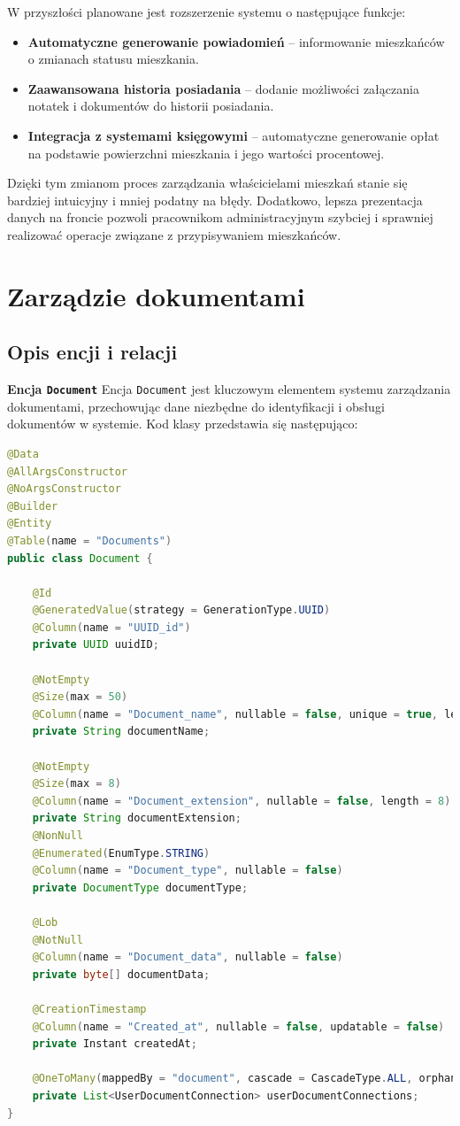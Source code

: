W przyszłości planowane jest rozszerzenie systemu o następujące funkcje:
\begin{itemize}
    \item \textbf{Automatyczne generowanie powiadomień} -- informowanie mieszkańców o zmianach statusu mieszkania.
    \item \textbf{Zaawansowana historia posiadania} -- dodanie możliwości załączania notatek i dokumentów do historii posiadania.
    \item \textbf{Integracja z systemami księgowymi} -- automatyczne generowanie opłat na podstawie powierzchni mieszkania i jego wartości procentowej.
\end{itemize}

Dzięki tym zmianom proces zarządzania właścicielami mieszkań stanie się bardziej intuicyjny i mniej podatny na błędy. Dodatkowo, lepsza prezentacja danych na froncie pozwoli pracownikom administracyjnym szybciej i sprawniej realizować operacje związane z przypisywaniem mieszkańców.


\section{Zarządzie dokumentami}

\subsection{Opis encji i relacji}

\textbf{Encja \texttt{Document}}  
Encja \texttt{Document} jest kluczowym elementem systemu zarządzania dokumentami, przechowując dane niezbędne do identyfikacji i obsługi dokumentów w systemie. Kod klasy przedstawia się następująco:

\begin{lstlisting}[language=Java, caption=Encja \texttt{Document}]
@Data
@AllArgsConstructor
@NoArgsConstructor
@Builder
@Entity
@Table(name = "Documents")
public class Document {

    @Id
    @GeneratedValue(strategy = GenerationType.UUID)
    @Column(name = "UUID_id")
    private UUID uuidID; 

    @NotEmpty
    @Size(max = 50)
    @Column(name = "Document_name", nullable = false, unique = true, length = 50)
    private String documentName; 

    @NotEmpty
    @Size(max = 8)
    @Column(name = "Document_extension", nullable = false, length = 8)
    private String documentExtension;
    @NonNull
    @Enumerated(EnumType.STRING)
    @Column(name = "Document_type", nullable = false)
    private DocumentType documentType; 

    @Lob
    @NotNull
    @Column(name = "Document_data", nullable = false)
    private byte[] documentData;

    @CreationTimestamp
    @Column(name = "Created_at", nullable = false, updatable = false)
    private Instant createdAt; 

    @OneToMany(mappedBy = "document", cascade = CascadeType.ALL, orphanRemoval = true)
    private List<UserDocumentConnection> userDocumentConnections; 
}
\end{lstlisting}

